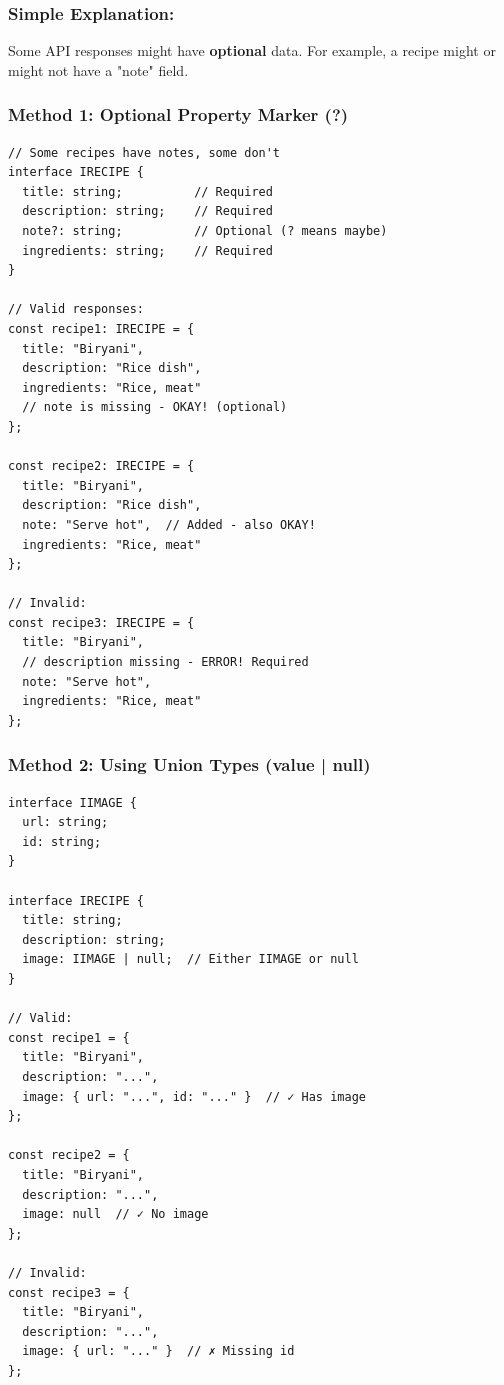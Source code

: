 \documentclass[12pt]{article}
\begin{document}
\subsubsection*{Simple Explanation:}

Some API responses might have \textbf{optional} data. For example, a recipe might or might not have a "note" field.

\subsubsection*{Method 1: Optional Property Marker (?)}

\begin{lstlisting}
// Some recipes have notes, some don't
interface IRECIPE {
  title: string;          // Required
  description: string;    // Required
  note?: string;          // Optional (? means maybe)
  ingredients: string;    // Required
}

// Valid responses:
const recipe1: IRECIPE = {
  title: "Biryani",
  description: "Rice dish",
  ingredients: "Rice, meat"
  // note is missing - OKAY! (optional)
};

const recipe2: IRECIPE = {
  title: "Biryani",
  description: "Rice dish",
  note: "Serve hot",  // Added - also OKAY!
  ingredients: "Rice, meat"
};

// Invalid:
const recipe3: IRECIPE = {
  title: "Biryani",
  // description missing - ERROR! Required
  note: "Serve hot",
  ingredients: "Rice, meat"
};
\end{lstlisting}

\subsubsection*{Method 2: Using Union Types (value | null)}

\begin{lstlisting}
interface IIMAGE {
  url: string;
  id: string;
}

interface IRECIPE {
  title: string;
  description: string;
  image: IIMAGE | null;  // Either IIMAGE or null
}

// Valid:
const recipe1 = {
  title: "Biryani",
  description: "...",
  image: { url: "...", id: "..." }  // ✓ Has image
};

const recipe2 = {
  title: "Biryani",
  description: "...",
  image: null  // ✓ No image
};

// Invalid:
const recipe3 = {
  title: "Biryani",
  description: "...",
  image: { url: "..." }  // ✗ Missing id
};
\end{lstlisting}
\end{document}
